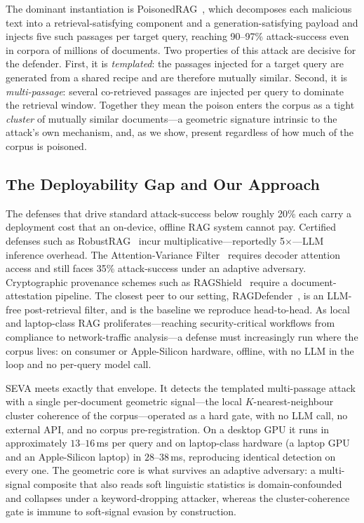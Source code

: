 \documentclass[conference]{IEEEtran}
\begin{document}
The dominant instantiation is PoisonedRAG~\cite{poisonedrag}, which decomposes
each malicious text into a retrieval-satisfying component and a
generation-satisfying payload and injects five such passages per target
query, reaching 90--97\% attack-success even in corpora of millions of
documents. Two properties of this attack are decisive for the defender. First,
it is \emph{templated}: the passages injected for a target query are generated
from a shared recipe and are therefore mutually similar. Second, it is
\emph{multi-passage}: several co-retrieved passages are injected per query to
dominate the retrieval window. Together they mean the poison enters the corpus
as a tight \emph{cluster} of mutually similar documents---a geometric signature
intrinsic to the attack's own mechanism, and, as we show, present regardless of
how much of the corpus is poisoned.

\subsection{The Deployability Gap and Our Approach}
The defenses that drive standard attack-success below roughly 20\% each carry a
deployment cost that an on-device, offline RAG system cannot pay. Certified
defenses such as RobustRAG~\cite{robustrag} incur multiplicative---reportedly
5$\times$---LLM inference overhead. The Attention-Variance Filter~\cite{avfilter}
requires decoder attention access and still faces 35\% attack-success under an
adaptive adversary. Cryptographic provenance schemes such as
RAGShield~\cite{ragshield} require a document-attestation pipeline. The
closest peer to our setting, RAGDefender~\cite{ragdefender}, is an LLM-free
post-retrieval filter, and is the baseline we reproduce head-to-head. As local
and laptop-class RAG proliferates---reaching security-critical workflows from
compliance to network-traffic analysis---a defense must increasingly
run where the corpus lives: on consumer or Apple-Silicon hardware, offline, with no
LLM in the loop and no per-query model call.

SEVA meets exactly that envelope. It detects the templated multi-passage attack
with a single per-document geometric signal---the local $K$-nearest-neighbour
cluster coherence of the corpus---operated as a hard gate, with no LLM call, no
external API, and no corpus pre-registration. On a desktop GPU it runs
in approximately $13$--$16$\,ms per query and on laptop-class hardware (a laptop GPU
and an Apple-Silicon laptop) in $28$--$38$\,ms, reproducing identical detection on
every one.
The geometric core is what survives an adaptive adversary: a multi-signal
composite that also reads soft linguistic statistics is domain-confounded and
collapses under a keyword-dropping attacker, whereas the cluster-coherence gate
is immune to soft-signal evasion by construction.
\end{document}
